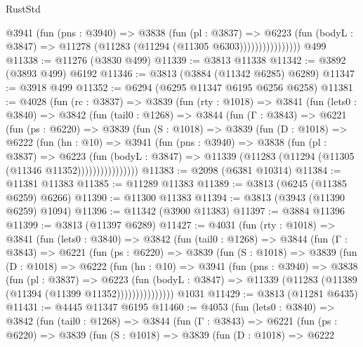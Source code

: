 \begin{lexlean}{RustStd}
\begin{coremodule}
{\begin{coremodule}
{{{{{{{{{{{{{{{{{{{{{{{{{{{{{{{{{{{                      @3941
                        (fun (pns : @3940) =>
                        @3838
                          (fun (pl : @3837) =>
                          @6223
                            (fun (bodyL : @3847) =>
                            @11278 (@11283 (@11294 (@11305 @6303))))))))))))))))
    @499
@11338 := @11276 (@3830 @499)
@11339 := @3813 @11338
@11342 := @3892 (@3893 @499) @6192
@11346 := @3813 (@3884 (@11342 @6285) @6289)
@11347 := @3918 @499
@11352 := @6294 (@6295 @11347 @6195 @6256 @6258)
@11381 := @4028
    (fun (rc : @3837) =>
    @3839
      (fun (rty : @1018) =>
      @3841
        (fun (lets0 : @3840) =>
        @3842
          (fun (tail0 : @1268) =>
          @3844
            (fun (Γ : @3843) =>
            @6221
              (fun (ps : @6220) =>
              @3839
                (fun (S : @1018) =>
                @3839
                  (fun (D : @1018) =>
                  @6222
                    (fun (hn : @10) =>
                    @3941
                      (fun (pns : @3940) =>
                      @3838
                        (fun (pl : @3837) =>
                        @6223
                          (fun (bodyL : @3847) =>
                          @11339 (@11283 (@11294 (@11305 (@11346 @11352))))))))))))))))
@11383 := @2098 (@6381 @10314)
@11384 := @11381 @11383
@11385 := @11289 @11383
@11389 := @3813 (@6245 (@11385 @6259) @6266)
@11390 := @11300 @11383
@11394 := @3813 (@3943 (@11390 @6259) @1094)
@11396 := @11342 (@3900 @11383)
@11397 := @3884 @11396
@11399 := @3813 (@11397 @6289)
@11427 := @4031
    (fun (rty : @1018) =>
    @3841
      (fun (lets0 : @3840) =>
      @3842
        (fun (tail0 : @1268) =>
        @3844
          (fun (Γ : @3843) =>
          @6221
            (fun (ps : @6220) =>
            @3839
              (fun (S : @1018) =>
              @3839
                (fun (D : @1018) =>
                @6222
                  (fun (hn : @10) =>
                  @3941
                    (fun (pns : @3940) =>
                    @3838
                      (fun (pl : @3837) =>
                      @6223
                        (fun (bodyL : @3847) =>
                        @11339 (@11283 (@11389 (@11394 (@11399 @11352)))))))))))))))
    @1031
@11429 := @3813 (@11281 @6435)
@11431 := @4445 @11347 @6195
@11460 := @4053
    (fun (lets0 : @3840) =>
    @3842
      (fun (tail0 : @1268) =>
      @3844
        (fun (Γ : @3843) =>
        @6221
          (fun (ps : @6220) =>
          @3839
            (fun (S : @1018) =>
            @3839
              (fun (D : @1018) =>
              @6222
}}}}}}}}}}}}}}}}}}}}}}}}}}}}}}}}}}}
\end{coremodule}}
\end{coremodule}
\end{lexlean}
